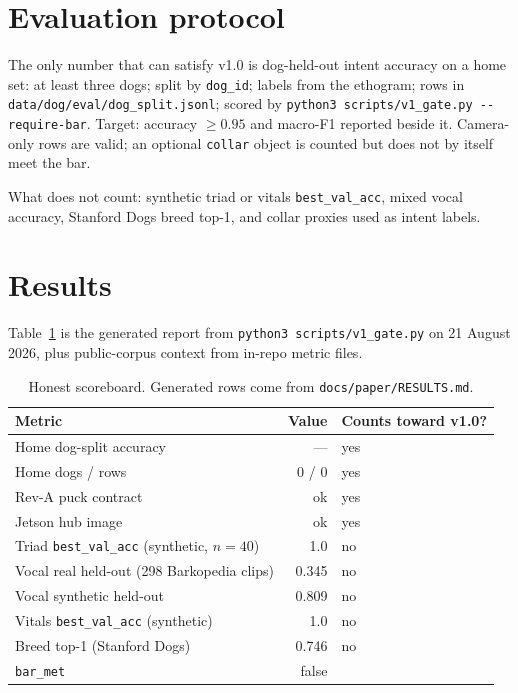 \documentclass[11pt]{article}
\begin{document}
\section{Evaluation protocol}

The only number that can satisfy v1.0 is dog-held-out intent accuracy on a home set:
at least three dogs; split by \texttt{dog\_id}; labels from the ethogram; rows in
\texttt{data/dog/eval/dog\_split.jsonl}; scored by \texttt{python3 scripts/v1\_gate.py -{}-require-bar}.
Target: accuracy $\ge 0.95$ and macro-F1 reported beside it.
Camera-only rows are valid; an optional \texttt{collar} object is counted but does not by itself meet the bar.

What does not count: synthetic triad or vitals \texttt{best\_val\_acc}, mixed vocal accuracy,
Stanford Dogs breed top-1, and collar proxies used as intent labels.

\section{Results}

Table~\ref{tab:results} is the generated report from \texttt{python3 scripts/v1\_gate.py} on
21 August 2026, plus public-corpus context from in-repo metric files.

\begin{table}[t]
\centering
\caption{Honest scoreboard. Generated rows come from \texttt{docs/paper/RESULTS.md}.}
\label{tab:results}
\begin{tabular}{lrl}
\toprule
Metric & Value & Counts toward v1.0? \\
\midrule
Home dog-split accuracy & --- & yes \\
Home dogs / rows & 0 / 0 & yes \\
Rev-A puck contract & ok & yes \\
Jetson hub image & ok & yes \\
Triad \texttt{best\_val\_acc} (synthetic, $n{=}40$) & 1.0 & no \\
Vocal real held-out (298 Barkopedia clips) & 0.345 & no \\
Vocal synthetic held-out & 0.809 & no \\
Vitals \texttt{best\_val\_acc} (synthetic) & 1.0 & no \\
Breed top-1 (Stanford Dogs) & 0.746 & no \\
\midrule
\texttt{bar\_met} & false & \\
\bottomrule
\end{tabular}
\end{table}
\end{document}
